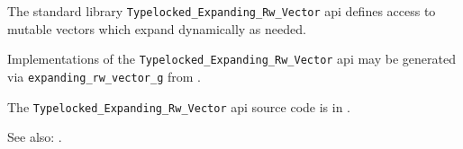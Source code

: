 
The standard library {\tt Typelocked\_Expanding\_Rw\_Vector} api defines access to mutable 
vectors which expand dynamically as needed.

Implementations of the {\tt Typelocked\_Expanding\_Rw\_Vector} api 
may be generated via {\tt expanding\_rw\_vector\_g} 
from .

The {\tt Typelocked\_Expanding\_Rw\_Vector} api source code is in .

See also:  .

